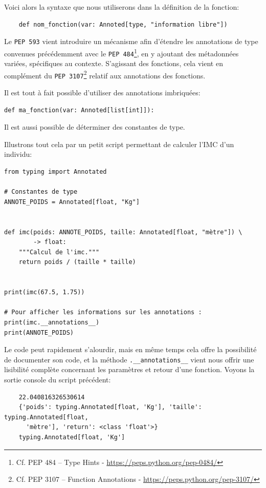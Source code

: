 \documentclass[a4paper,12pt]{book}
\begin{document}
Voici alors la syntaxe que nous utiliserons dans la définition de la fonction:
\begin{verbatim}
    def nom_fonction(var: Annoted[type, "information libre"])
\end{verbatim}
\medskip

Le \texttt{PEP 593} vient introduire un mécanisme afin d'étendre les annotations de type convenues précédemment avec le \texttt{PEP 484}\footnote{Cf. PEP 484 – Type Hints - \url{https://peps.python.org/pep-0484/}}, en y ajoutant des métadonnées variées, spécifiques au contexte. S'agissant des fonctions, cela vient en complément du \texttt{PEP 3107}\footnote{Cf. PEP 3107 – Function Annotations - \url{https://peps.python.org/pep-3107/}} relatif aux annotations des fonctions.
\medskip

Il est tout à fait possible d'utiliser des annotations imbriquées:
\begin{lstlisting}[caption=Les annotations imbriquées]
def ma_fonction(var: Annoted[list[int]]):
\end{lstlisting}
\medskip

Il est aussi possible de déterminer des constantes de type.
\medskip

Illustrons tout cela par un petit script permettant de calculer l'IMC d'un individu:
\begin{lstlisting}[caption=Exemple d'annotations de type avec la fonction \texttt{Annoted}]
from typing import Annotated

# Constantes de type
ANNOTE_POIDS = Annotated[float, "Kg"]


def imc(poids: ANNOTE_POIDS, taille: Annotated[float, "mètre"]) \ 
        -> float:
    """Calcul de l'imc."""
    return poids / (taille * taille)


print(imc(67.5, 1.75))

# Pour afficher les informations sur les annotations :
print(imc.__annotations__)
print(ANNOTE_POIDS)
\end{lstlisting}
\medskip

Le code peut rapidement s'alourdir, mais en même temps cela offre la possibilité de documenter son code, et la méthode \verb|.__annotations__| vient nous offrir une lisibilité complète concernant les paramètres et retour d'une fonction. Voyons la sortie console du script précédent:
\begin{verbatim}
    22.040816326530614
    {'poids': typing.Annotated[float, 'Kg'], 'taille': typing.Annotated[float, 
      'mètre'], 'return': <class 'float'>}
    typing.Annotated[float, 'Kg']
\end{verbatim}
\medskip
\end{document}
